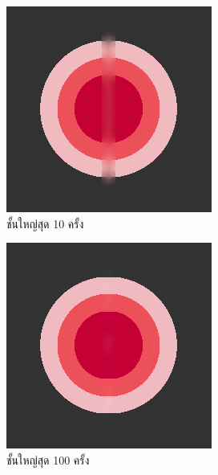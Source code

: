 \documentclass[hidelinks, a4paper,12pt]{article}
\numberwithin{equation}{section}							%
\numberwithin{equation}{section}
\begin{document}
{	\begin{figure}[H]
		\centering
		\begin{subfigure}{0.4\linewidth}
			\centering
			\includegraphics[width=0.8\linewidth]{images/just10enough/only10time.png}
			\caption{ชั้นใหญ่สุด 10 ครั้ง}
		\end{subfigure}
		\begin{subfigure}{0.4\linewidth}
			\centering
			\includegraphics[width=0.8\linewidth]{images/just10enough/only100time.png}
			\caption{ชั้นใหญ่สุด 100 ครั้ง}
		\end{subfigure}
		\begin{subfigure}{0.4\linewidth}

\end{subfigure}
\end{figure}}
\end{document}
